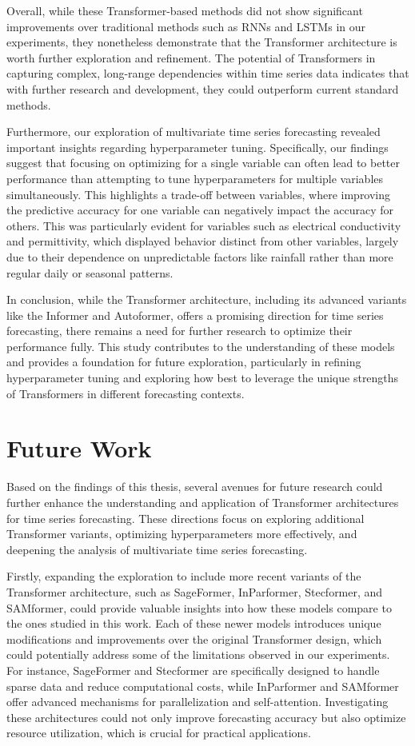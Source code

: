 Overall, while these Transformer-based methods did not show significant improvements over traditional methods such as RNNs and LSTMs in our experiments, they nonetheless demonstrate that the Transformer architecture is worth further exploration and refinement. The potential of Transformers in capturing complex, long-range dependencies within time series data indicates that with further research and development, they could outperform current standard methods.

Furthermore, our exploration of multivariate time series forecasting revealed important insights regarding hyperparameter tuning. Specifically, our findings suggest that focusing on optimizing for a single variable can often lead to better performance than attempting to tune hyperparameters for multiple variables simultaneously. This highlights a trade-off between variables, where improving the predictive accuracy for one variable can negatively impact the accuracy for others. This was particularly evident for variables such as electrical conductivity and permittivity, which displayed behavior distinct from other variables, largely due to their dependence on unpredictable factors like rainfall rather than more regular daily or seasonal patterns.

In conclusion, while the Transformer architecture, including its advanced variants like the Informer and Autoformer, offers a promising direction for time series forecasting, there remains a need for further research to optimize their performance fully. This study contributes to the understanding of these models and provides a foundation for future exploration, particularly in refining hyperparameter tuning and exploring how best to leverage the unique strengths of Transformers in different forecasting contexts.

\section{Future Work}

Based on the findings of this thesis, several avenues for future research could further enhance the understanding and application of Transformer architectures for time series forecasting. These directions focus on exploring additional Transformer variants, optimizing hyperparameters more effectively, and deepening the analysis of multivariate time series forecasting.

Firstly, expanding the exploration to include more recent variants of the Transformer architecture, such as SageFormer, InParformer, Stecformer, and SAMformer, could provide valuable insights into how these models compare to the ones studied in this work. Each of these newer models introduces unique modifications and improvements over the original Transformer design, which could potentially address some of the limitations observed in our experiments. For instance, SageFormer and Stecformer are specifically designed to handle sparse data and reduce computational costs, while InParformer and SAMformer offer advanced mechanisms for parallelization and self-attention. Investigating these architectures could not only improve forecasting accuracy but also optimize resource utilization, which is crucial for practical applications.

